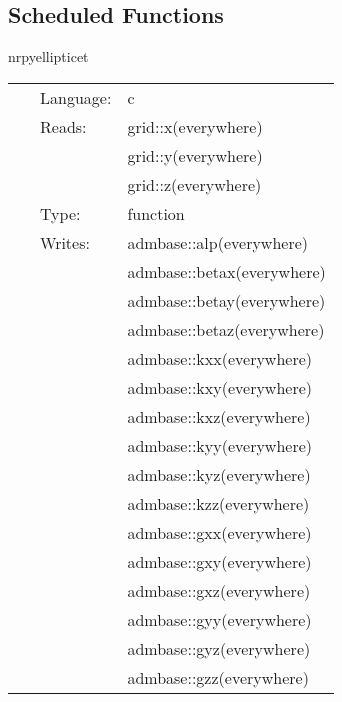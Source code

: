 \subsection*{Scheduled Functions}
\vspace{5mm}


\hspace{5mm} nrpyellipticet 

\hspace{5mm}{\it set up metric fields for binary black hole initial data } 


\hspace{5mm}

 \begin{tabular*}{160mm}{cll} 
~ & Language:  & c \\ 
~ & Reads:  & grid::x(everywhere) \\ 
~& ~ &grid::y(everywhere)\\ 
~& ~ &grid::z(everywhere)\\ 
~ & Type:  & function \\ 
~ & Writes:  & admbase::alp(everywhere) \\ 
~& ~ &admbase::betax(everywhere)\\ 
~& ~ &admbase::betay(everywhere)\\ 
~& ~ &admbase::betaz(everywhere)\\ 
~& ~ &admbase::kxx(everywhere)\\ 
~& ~ &admbase::kxy(everywhere)\\ 
~& ~ &admbase::kxz(everywhere)\\ 
~& ~ &admbase::kyy(everywhere)\\ 
~& ~ &admbase::kyz(everywhere)\\ 
~& ~ &admbase::kzz(everywhere)\\ 
~& ~ &admbase::gxx(everywhere)\\ 
~& ~ &admbase::gxy(everywhere)\\ 
~& ~ &admbase::gxz(everywhere)\\ 
~& ~ &admbase::gyy(everywhere)\\ 
~& ~ &admbase::gyz(everywhere)\\ 
~& ~ &admbase::gzz(everywhere)\\ 
\end{tabular*} 


\vspace{5mm}


